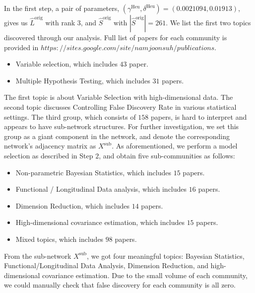\documentclass[AMS,STIX1COL]{WileyNJD-v2}
\begin{document}
{In the first step, a pair of parameters, $(\gamma^{\text{Heu}},\delta^{\text{Heu}}) = (0.0021094, 0.01913)$, gives us $\widehat{L}^{\mbox{orig}}$ with rank $3$, and $\widehat{S}^{\mbox{orig}}$ with $|\widehat{S}^{\mbox{orig}}|=261$.
We list the first two topics discovered through our analysis. Full list of papers for each community is provided in $https://sites.google.com/site/namjoonsuh/publications$.
\begin{itemize}
    \item Variable selection, which includes $43$ paper.
    \item Multiple Hypothesis Testing, which includes $31$ papers.
\end{itemize}
The first topic is about Variable Selection with high-dimensional data.
The second topic discusses Controlling False Discovery Rate in various statistical settings.
The third group, which consists of $158$ papers, is hard to interpret and appears to have sub-network structures.
For further investigation, we set this group as a giant component in the network, and denote the corresponding network's adjacency matrix as $X^{\mbox{sub}}$.
As aforementioned, we perform a model selection as described in Step $2$, and obtain five sub-communities as follows:

\begin{itemize}
    \item Non-parametric Bayesian Statistics, which includes $15$ papers.
    \item Functional / Longitudinal Data analysis, which includes $16$ papers.
    \item Dimension Reduction, which includes $14$ papers.
    \item High-dimensional covariance estimation, which includes $15$ papers.
    \item Mixed topics, which includes $98$ papers.
\end{itemize}
From the sub-network $X^{\mbox{sub}}$, we got four meaningful topics: Bayesian Statistics, Functional/Longitudinal Data Analysis, Dimension Reduction, and high-dimensional covariance estimation.
Due to the small volume of each community, we could manually check that false discovery for each community is all zero.

}
\end{document}
